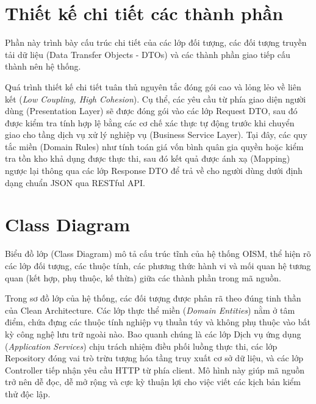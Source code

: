 \documentclass[12pt,a4paper]{report}
\begin{document}
	\section{Thiết kế chi tiết các thành phần}
	Phần này trình bày cấu trúc chi tiết của các lớp đối tượng, các đối tượng truyền tải dữ liệu (Data Transfer Objects - DTOs) và các thành phần giao tiếp cấu thành nên hệ thống.
	\par
	Quá trình thiết kế chi tiết tuân thủ nguyên tắc đóng gói cao và lỏng lẻo về liên kết (\textit{Low Coupling, High Cohesion}). Cụ thể, các yêu cầu từ phía giao diện người dùng (Presentation Layer) sẽ được đóng gói vào các lớp Request DTO, sau đó được kiểm tra tính hợp lệ bằng các cơ chế xác thực tự động trước khi chuyển giao cho tầng dịch vụ xử lý nghiệp vụ (Business Service Layer). Tại đây, các quy tắc miền (Domain Rules) như tính toán giá vốn bình quân gia quyền hoặc kiểm tra tồn kho khả dụng được thực thi, sau đó kết quả được ánh xạ (Mapping) ngược lại thông qua các lớp Response DTO để trả về cho người dùng dưới định dạng chuẩn JSON qua RESTful API.
	
	\section{Class Diagram}
	Biểu đồ lớp (Class Diagram) mô tả cấu trúc tĩnh của hệ thống OISM, thể hiện rõ các lớp đối tượng, các thuộc tính, các phương thức hành vi và mối quan hệ tương quan (kết hợp, phụ thuộc, kế thừa) giữa các thành phần trong mã nguồn.
	\par
	Trong sơ đồ lớp của hệ thống, các đối tượng được phân rã theo đúng tinh thần của Clean Architecture. Các lớp thực thể miền (\textit{Domain Entities}) nằm ở tâm điểm, chứa đựng các thuộc tính nghiệp vụ thuần túy và không phụ thuộc vào bất kỳ công nghệ lưu trữ ngoài nào. Bao quanh chúng là các lớp Dịch vụ ứng dụng (\textit{Application Services}) chịu trách nhiệm điều phối luồng thực thi, các lớp Repository đóng vai trò trừu tượng hóa tầng truy xuất cơ sở dữ liệu, và các lớp Controller tiếp nhận yêu cầu HTTP từ phía client. Mô hình này giúp mã nguồn trở nên dễ đọc, dễ mở rộng và cực kỳ thuận lợi cho việc viết các kịch bản kiểm thử độc lập.
	
\end{document}
